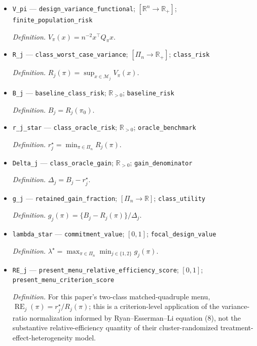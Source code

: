 \documentclass{article}
\begin{document}
\begin{itemize}
  \item \texttt{V\_\allowbreak{}pi} --- \texttt{design\_\allowbreak{}variance\_\allowbreak{}functional}; \([\mathbb R^n\to\mathbb R_+]\); \texttt{finite\_\allowbreak{}population\_\allowbreak{}risk}
  \par\smallskip\noindent\emph{Definition.} \(V_\pi(x)=n^{-2}x^\top Q_\pi x\).
  \item \texttt{R\_\allowbreak{}j} --- \texttt{class\_\allowbreak{}worst\_\allowbreak{}case\_\allowbreak{}variance}; \([\Pi_n\to\mathbb R_+]\); \texttt{class\_\allowbreak{}risk}
  \par\smallskip\noindent\emph{Definition.} \(R_j(\pi)=\sup_{x\in\mathcal M_j}V_\pi(x)\).
  \item \texttt{B\_\allowbreak{}j} --- \texttt{baseline\_\allowbreak{}class\_\allowbreak{}risk}; \(\mathbb R_{>0}\); \texttt{baseline\_\allowbreak{}risk}
  \par\smallskip\noindent\emph{Definition.} \(B_j=R_j(\pi_0)\).
  \item \texttt{r\_\allowbreak{}j\_\allowbreak{}star} --- \texttt{class\_\allowbreak{}oracle\_\allowbreak{}risk}; \(\mathbb R_{>0}\); \texttt{oracle\_\allowbreak{}benchmark}
  \par\smallskip\noindent\emph{Definition.} \(r_j^\star=\min_{\pi\in\Pi_n}R_j(\pi)\).
  \item \texttt{Delta\_\allowbreak{}j} --- \texttt{class\_\allowbreak{}oracle\_\allowbreak{}gain}; \(\mathbb R_{>0}\); \texttt{gain\_\allowbreak{}denominator}
  \par\smallskip\noindent\emph{Definition.} \(\Delta_j=B_j-r_j^\star\).
  \item \texttt{g\_\allowbreak{}j} --- \texttt{retained\_\allowbreak{}gain\_\allowbreak{}fraction}; \([\Pi_n\to\mathbb R]\); \texttt{class\_\allowbreak{}utility}
  \par\smallskip\noindent\emph{Definition.} \(g_j(\pi)=\{B_j-R_j(\pi)\}/\Delta_j\).
  \item \texttt{lambda\_\allowbreak{}star} --- \texttt{commitment\_\allowbreak{}value}; \([0,1]\); \texttt{focal\_\allowbreak{}design\_\allowbreak{}value}
  \par\smallskip\noindent\emph{Definition.} \(\lambda^\star=\max_{\pi\in\Pi_n}\min_{j\in\{1,2\}}g_j(\pi)\).
  \item \texttt{RE\_\allowbreak{}j} --- \texttt{present\_\allowbreak{}menu\_\allowbreak{}relative\_\allowbreak{}efficiency\_\allowbreak{}score}; \([0,1]\); \texttt{present\_\allowbreak{}menu\_\allowbreak{}criterion\_\allowbreak{}score}
  \par\smallskip\noindent\emph{Definition.} For this paper's two-class matched-quadruple menu, \(\operatorname{RE}_j(\pi)=r_j^\star/R_j(\pi)\); this is a criterion-level application of the variance-ratio normalization informed by Ryan--Esserman--Li equation (8), not the substantive relative-efficiency quantity of their cluster-randomized treatment-effect-heterogeneity model.

\end{itemize}
\end{document}
